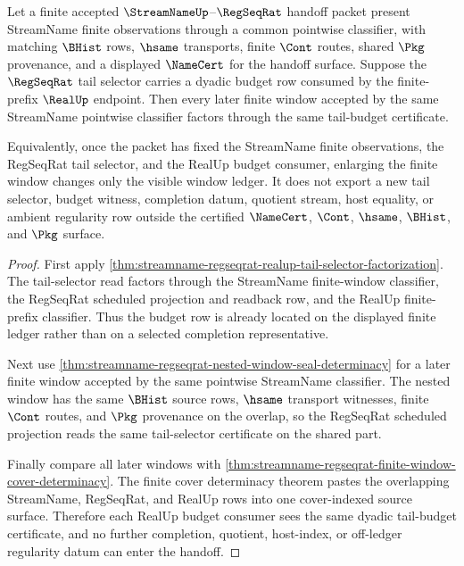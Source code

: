 \begin{theorem}
\label{thm:streamname-regseqrat-tail-budget-uniformity}
Let a finite accepted $\StreamNameUp$--$\RegSeqRat$ handoff packet present
StreamName finite observations through a common pointwise classifier, with
matching $\BHist$ rows, $\hsame$ transports, finite $\Cont$ routes, shared
$\Pkg$ provenance, and a displayed $\NameCert$ for the handoff surface. Suppose
the $\RegSeqRat$ tail selector carries a dyadic budget row consumed by the
finite-prefix $\RealUp$ endpoint. Then every later finite window accepted by
the same StreamName pointwise classifier factors through the same tail-budget
certificate.

Equivalently, once the packet has fixed the StreamName finite observations,
the RegSeqRat tail selector, and the RealUp budget consumer, enlarging the
finite window changes only the visible window ledger. It does not export a new
tail selector, budget witness, completion datum, quotient stream, host equality,
or ambient regularity row outside the certified $\NameCert$, $\Cont$, $\hsame$,
$\BHist$, and $\Pkg$ surface.
\end{theorem}
\begin{proof}
First apply
\autoref{thm:streamname-regseqrat-realup-tail-selector-factorization}. The
tail-selector read factors through the StreamName finite-window classifier,
the RegSeqRat scheduled projection and readback row, and the RealUp
finite-prefix classifier. Thus the budget row is already located on the
displayed finite ledger rather than on a selected completion representative.

Next use
\autoref{thm:streamname-regseqrat-nested-window-seal-determinacy} for a later
finite window accepted by the same pointwise StreamName classifier. The nested
window has the same $\BHist$ source rows, $\hsame$ transport witnesses, finite
$\Cont$ routes, and $\Pkg$ provenance on the overlap, so the RegSeqRat
scheduled projection reads the same tail-selector certificate on the shared
part.

Finally compare all later windows with
\autoref{thm:streamname-regseqrat-finite-window-cover-determinacy}. The finite
cover determinacy theorem pastes the overlapping StreamName, RegSeqRat, and
RealUp rows into one cover-indexed source surface. Therefore each RealUp
budget consumer sees the same dyadic tail-budget certificate, and no further
completion, quotient, host-index, or off-ledger regularity datum can enter the
handoff.
\end{proof}

